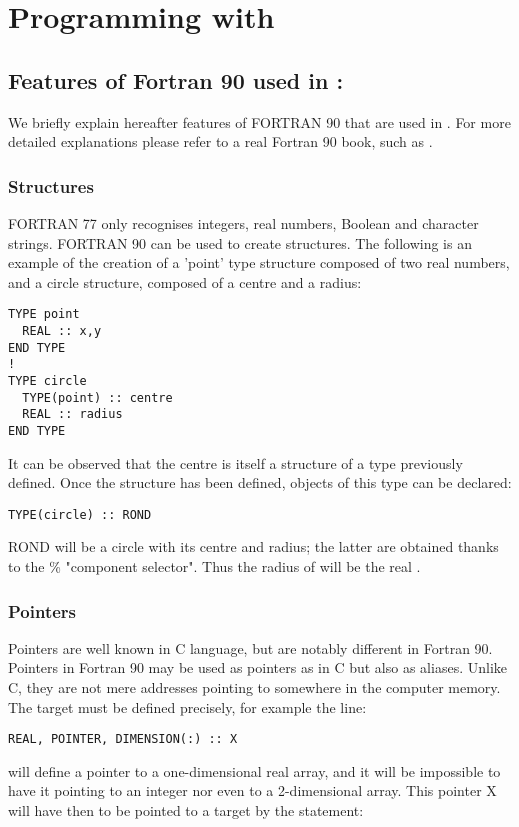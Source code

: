 \chapter{Programming with \bief}
%
%
%
\section{Features of Fortran 90 used in \bief:}
%
We briefly explain hereafter features of FORTRAN 90 that are used in \bief. For
more detailed explanations please refer to a real Fortran 90 book, such as
\citet{Metcalf1990}.

\subsection{Structures}

FORTRAN 77 only recognises integers, real numbers, Boolean and character
strings. FORTRAN 90 can be used to create structures. The following is an
example of the creation of a 'point' type structure composed of two real
numbers, and a circle structure, composed of a centre and a radius:

\begin{lstlisting}[language=TelFortran]
TYPE point
  REAL :: x,y
END TYPE
!
TYPE circle
  TYPE(point) :: centre
  REAL :: radius
END TYPE
\end{lstlisting}

It can be observed that the centre is itself a structure of a type previously
defined. Once the structure has been defined, objects of this type can be
declared:
\begin{lstlisting}[language=TelFortran]
TYPE(circle) :: ROND
\end{lstlisting}
ROND will be a circle with its centre and radius; the latter are obtained
thanks to the \% "component selector". Thus the radius of  will be
the real .

\subsection{Pointers}

Pointers are well known in C language, but are notably different in Fortran 90.
Pointers in Fortran 90 may be used as pointers as in C but also as aliases.
Unlike C, they are not mere addresses pointing to somewhere in the computer
memory. The target must be defined precisely, for example the line:

\begin{lstlisting}[language=TelFortran]
REAL, POINTER, DIMENSION(:) :: X
\end{lstlisting}
will define a pointer to a one-dimensional real array, and it will be
impossible to have it pointing to an integer nor even to a 2-dimensional array.
This pointer X will have then to be pointed to a target by the statement:



